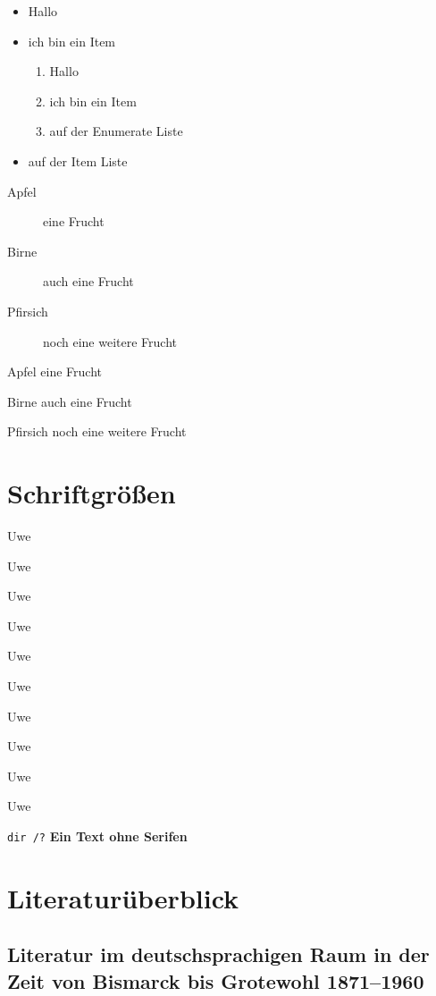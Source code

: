 \documentclass[ngerman,12pt,parskip=half]{scrreprt}
\begin{document}
\begin{itemize}
\item Hallo
\item ich bin ein Item
\begin{enumerate}
\item Hallo
\item ich bin ein Item
\item auf der Enumerate Liste
\end{enumerate}

\item auf der Item Liste
\end{itemize}


\begin{description}
\item[Apfel] eine Frucht
\item[Birne] auch eine Frucht
\item[Pfirsich] noch eine weitere Frucht
\end{description}

\begin{compactdesc}
\item[Apfel] eine Frucht
\item[Birne] auch eine Frucht
\item[Pfirsich] noch eine weitere Frucht
\end{compactdesc}

\section{Schriftgrößen}

{\tiny Uwe}

{\scriptsize Uwe} 

{\footnotesize Uwe} 

{\small Uwe} 

{\normalsize Uwe} 

{\large Uwe} 

{\Large Uwe} 

{\LARGE Uwe} 

{\huge Uwe} 

{\Huge Uwe} 

\texttt{dir /?} \textsf{\bfseries Ein Text ohne Serifen}

\section{Literaturüberblick}

\blindtext[15]

\subsection[Literatur im deutschsprachigen Raum]{Literatur im deutschsprachigen Raum in der Zeit von Bismarck bis Grotewohl 1871--1960}
\end{document}
